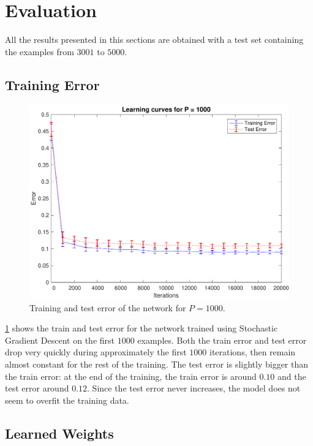 \section{Evaluation}
\label{sec:evaluation}

All the results presented in this sections are obtained with a test set containing the examples from $3001$ to $5000$.

\subsection{Training Error}
\begin{figure}[t]
	\centering
	\includegraphics[width=\columnwidth]{figures/error}
    \caption{Training and test error of the network for $P = 1000$.}
	\label{fig:training_error}
\end{figure}

\cref{fig:training_error} shows the train and test error for the network trained using Stochastic Gradient Descent on the first $1000$ examples.
Both the train error and test error drop very quickly during approximately the first $1000$ iterations, then remain almost constant for the rest of the training.
The test error is slightly bigger than the train error:
at the end of the training, the train error is around $0.10$ and the test error around $0.12$.
Since the test error never increases, the model does not seem to overfit the training data.

\subsection{Learned Weights}

